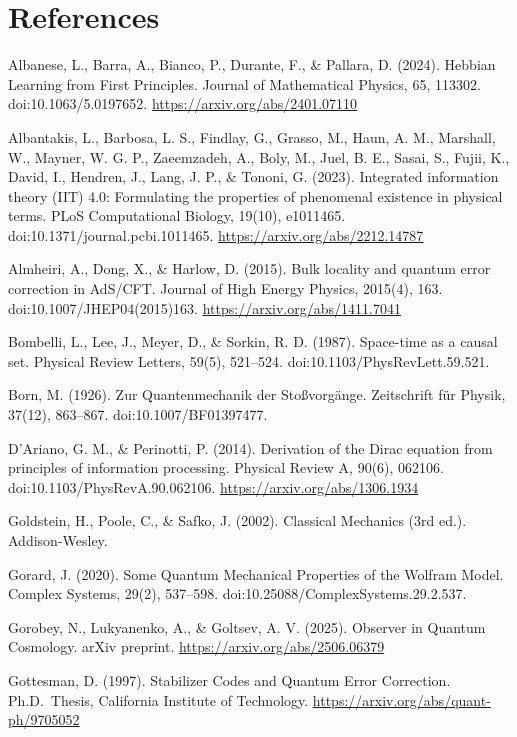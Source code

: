 \documentclass[11pt,oneside]{report}
\theoremstyle{definition}
\theoremstyle{remark}
\newenvironment{reflist}
  {\par\small\setlength{\parindent}{0pt}%
   \setlength{\leftskip}{1.6em}\setlength{\parindent}{-1.6em}%
   \setlength{\parskip}{0.4em}%
   \raggedright\hyphenpenalty=50\exhyphenpenalty=50\relax
   \sloppy}
  {\par}
\begin{document}
\section*{References}
\begin{reflist}
Albanese, L., Barra, A., Bianco, P., Durante, F., \& Pallara, D. (2024).
Hebbian Learning from First Principles. Journal of Mathematical Physics,
65, 113302. doi:10.1063/5.0197652.
\url{https://arxiv.org/abs/2401.07110}

Albantakis, L., Barbosa, L. S., Findlay, G., Grasso, M., Haun, A. M.,
Marshall, W., Mayner, W. G. P., Zaeemzadeh, A., Boly, M., Juel, B. E.,
Sasai, S., Fujii, K., David, I., Hendren, J., Lang, J. P., \& Tononi, G.
(2023). Integrated information theory (IIT) 4.0: Formulating the
properties of phenomenal existence in physical terms. PLoS Computational
Biology, 19(10), e1011465. doi:10.1371/journal.pcbi.1011465.
\url{https://arxiv.org/abs/2212.14787}

Almheiri, A., Dong, X., \& Harlow, D. (2015). Bulk locality and quantum
error correction in AdS/CFT. Journal of High Energy Physics, 2015(4),
163. doi:10.1007/JHEP04(2015)163. \url{https://arxiv.org/abs/1411.7041}

Bombelli, L., Lee, J., Meyer, D., \& Sorkin, R. D. (1987). Space-time as
a causal set. Physical Review Letters, 59(5), 521--524.
doi:10.1103/PhysRevLett.59.521.

Born, M. (1926). Zur Quantenmechanik der Stoßvorgänge. Zeitschrift für
Physik, 37(12), 863--867. doi:10.1007/BF01397477.

D'Ariano, G. M., \& Perinotti, P. (2014). Derivation of the Dirac
equation from principles of information processing. Physical Review A,
90(6), 062106. doi:10.1103/PhysRevA.90.062106.
\url{https://arxiv.org/abs/1306.1934}

Goldstein, H., Poole, C., \& Safko, J. (2002). Classical Mechanics (3rd
ed.). Addison-Wesley.

Gorard, J. (2020). Some Quantum Mechanical Properties of the Wolfram
Model. Complex Systems, 29(2), 537--598.
doi:10.25088/ComplexSystems.29.2.537.

Gorobey, N., Lukyanenko, A., \& Goltsev, A. V. (2025). Observer in
Quantum Cosmology. arXiv preprint.
\url{https://arxiv.org/abs/2506.06379}

Gottesman, D. (1997). Stabilizer Codes and Quantum Error Correction.
Ph.D.~Thesis, California Institute of Technology.
\url{https://arxiv.org/abs/quant-ph/9705052}


\end{reflist}
\end{document}
